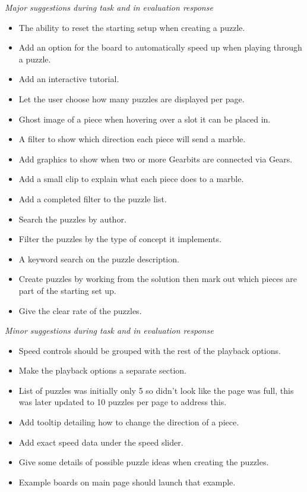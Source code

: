 \documentclass{l4proj}
\begin{document}
\emph{Major suggestions during task and in evaluation response}
\label{suggestions}
\begin{itemize}
    \item The ability to reset the starting setup when creating a puzzle.
    \item Add an option for the board to automatically speed up when playing through a puzzle.
    \item Add an interactive tutorial.
    \item Let the user choose how many puzzles are displayed per page.
    \item Ghost image of a piece when hovering over a slot it can be placed in.
    \item A filter to show which direction each piece will send a marble.
    \item Add graphics to show when two or more Gearbits are connected via Gears.
    \item Add a small clip to explain what each piece does to a marble.
    \item Add a completed filter to the puzzle list.
    \item Search the puzzles by author.
    \item Filter the puzzles by the type of concept it implements.
    \item A keyword search on the puzzle description.
    \item Create puzzles by working from the solution then mark out which pieces are part of the starting set up.
    \item Give the clear rate of the puzzles.
\end{itemize}

\emph{Minor suggestions during task and in evaluation response}
\begin{itemize}
    \item Speed controls should be grouped with the rest of the playback options.
    \item Make the playback options a separate section.
    \item List of puzzles was initially only 5 so didn't look like the page was full, this was later updated to 10 puzzles per page to address this.
    \item Add tooltip detailing how to change the direction of a piece.
    \item Add exact speed data under the speed slider.
    \item Give some details of possible puzzle ideas when creating the puzzles.
    \item Example boards on main page should launch that example.
\end{itemize}
\end{document}
